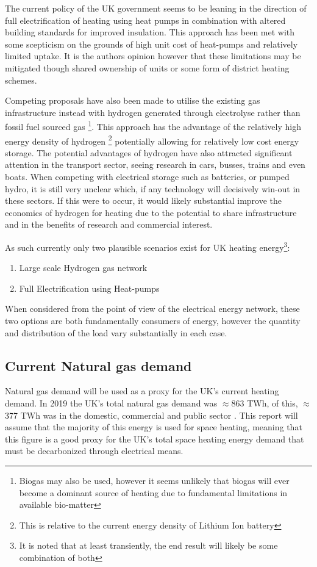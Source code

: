 \documentclass[11pt]{article}
\numberwithin{equation}{section}
\begin{document}
The current policy of the UK government seems to be leaning in the direction of full electrification of heating using heat pumps in combination with altered building standards for improved insulation. This approach has been met with some scepticism on the grounds of high unit cost of heat-pumps and relatively limited uptake. It is the authors opinion however that these limitations may be mitigated though shared ownership of units or some form of district heating schemes.

Competing proposals have also been made to utilise the existing gas infrastructure instead with hydrogen generated through electrolyse rather than fossil fuel sourced gas \footnote{Biogas may also be used, however it seems unlikely that biogas will ever become a dominant source of heating due to fundamental limitations in available bio-matter}. This approach has the advantage of the relatively high energy density of hydrogen \footnote{This is relative to the current energy density of Lithium Ion battery} potentially allowing for relatively low cost energy storage. The potential advantages of hydrogen have also attracted significant attention in the transport sector, seeing research in cars, busses, trains and even boats. When competing with electrical storage such as batteries, or pumped hydro, it is still very unclear which, if any technology will decisively win-out in these sectors. If this were to occur,  it would likely substantial improve the economics of hydrogen for heating due to the potential to share infrastructure and in the benefits of research and commercial interest.

As such currently only two plausible scenarios exist for UK heating energy\footnote{It is noted that at least transiently, the end result will likely be some combination of both}:
\begin{enumerate}
\item Large scale Hydrogen gas network
\item Full Electrification using Heat-pumps
\end{enumerate}

When considered from the point of view of the electrical energy network, these two options are both fundamentally consumers of energy, however the quantity and distribution of the load vary substantially in each case.
\subsection{Current Natural gas demand \label{secCurrentNatGasDemand}}
\label{sec:orga0ce602}
Natural gas demand will be used as a proxy for the UK's current heating demand. In 2019 the UK's total natural gas demand was \(\approx\)863 TWh, of this, \(\approx\)377 TWh was in the domestic, commercial and public sector \cite{NaturalGas}. This report will assume that the majority of this energy is used for space heating, meaning that this figure is a good proxy for the UK's total space heating energy demand that must be decarbonized through electrical means.
\end{document}

